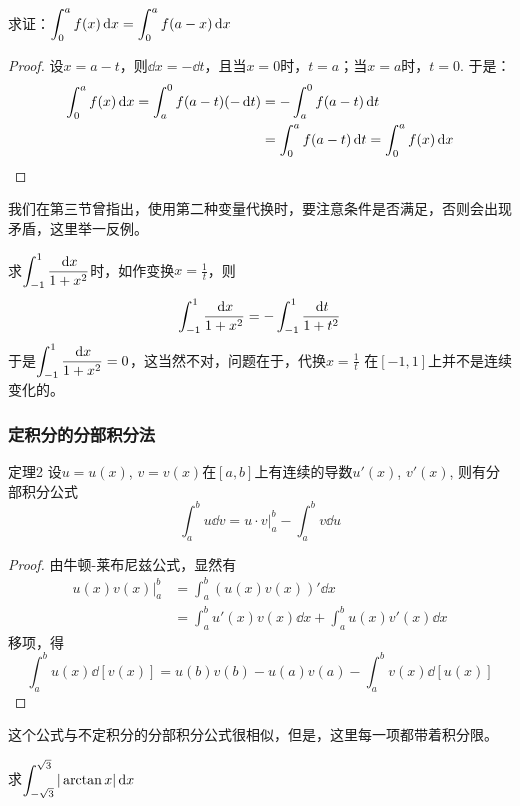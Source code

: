 \begin{example}
求证：$\displaystyle\int^a_0 f(x)\,{\rm d} x=\displaystyle\int^a_0 f(a-x)\,{\rm d} x$
\end{example}

\begin{proof}
    设$x=a-t$，则$\dd x=-\dd t$，且当$x=0$时，$t=a$；当$x=a$时，$t=0$. 于是：
\[\begin{split}
    \displaystyle\int^a_0 f(x)\,{\rm d} x=\int^0_a f(a-t)(-\,{\rm d} t)&=-\int^0_a f(a-t)\,{\rm d} t\\
    &=\int^a_0 f(a-t)\,{\rm d} t=\displaystyle\int^a_0 f(x)\,{\rm d} x
\end{split}\]
\end{proof}

我们在第三节曾指出，使用第二种变量代换时，要注意条件是否满足，否则会出现矛盾，这里举一反例。

求$\displaystyle\int^{1}_{-1}\dfrac{\,{\rm d} x}{1+x^2}$时，如作变换$x=\frac{1}{t}$，则
\[\displaystyle\int^{1}_{-1}\dfrac{\,{\rm d} x}{1+x^2}=-\displaystyle\int^{1}_{-1}\dfrac{\,{\rm d} t}{1+t^2}\]
于是$\displaystyle\int^{1}_{-1}\dfrac{\,{\rm d} x}{1+x^2}=0$，这当然不对，问题在于，代换$x=\frac{1}{t}$
在$[-1,1]$上并不是连续变化的。


\subsubsection{定积分的分部积分法}
\begin{blk}
    {定理2} 设$u=u(x)$, $v=v(x)$在$[a,b]$上有连续的导数$u'(x)$, $v'(x)$, 则有分部积分公式
\[\int^b_a u\dd v=u\cdot v\Big|^b_a- \int^b_a v\dd u\]
\end{blk}

\begin{proof}
    由牛顿-莱布尼兹公式，显然有
\[\begin{split}
    u (x) v (x)\Big|^b_a &=\int^b_a (u (x) v (x) ) '\dd x\\
&=\int^b_a u' (x) v (x) \dd x+\int^b_a u (x) v' (x) \dd x
\end{split}\]
移项，得
\[\int^b_a u (x) \dd [v (x) ] =u (b) v (b) -u (a) v (a) -\int^b_a v (x) \dd [u (x) ] \]
\end{proof}

这个公式与不定积分的分部积分公式很相似，但是，这里每一项都带着积分限。

\begin{example}
求$\displaystyle\int^{\sqrt{3}}_{-\sqrt{3}}|\arctan x|\,{\rm d} x$
\end{example}

